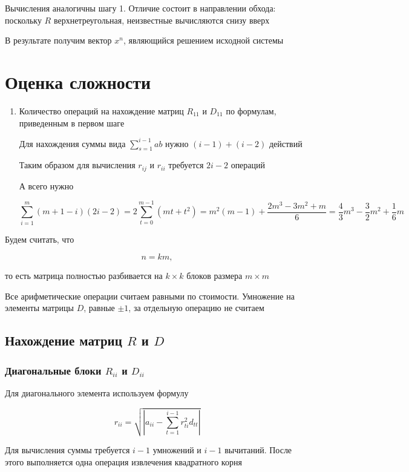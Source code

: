 \documentclass[a4paper,12pt]{article}
\begin{document}
Вычисления аналогичны шагу 1. Отличие состоит в направлении обхода:
поскольку $R$ верхнетреугольная, неизвестные вычисляются снизу вверх

В результате получим вектор $x^n$, являющийся решением исходной
системы

\section{Оценка сложности}

\begin{enumerate}
  \item Количество операций на нахождение матриц $R_{11}$ и $D_{11}$ по формулам, приведенным в первом шаге

  Для нахождения суммы вида $\sum_{s = 1}^{i - 1} a b$ нужно $(i - 1) + (i - 2)$ действий

  Таким образом для вычисления $r_{ij}$ и $r_{ii}$ требуется $2i - 2$ операций

  А всего нужно

  $$\sum_{i = 1}^{m} (m + 1 - i) (2i - 2) = 2\sum_{t = 0}^{m - 1} (mt + t^2) = m^2 (m - 1) + \frac{2m^3 - 3m^2 + m}{6} = \frac{4}{3} m^3 - \frac{3}{2} m^2 + \frac{1}{6} m$$
\end{enumerate}

Будем считать, что

$$
n=km,
$$

то есть матрица полностью разбивается на \(k\times k\) блоков размера \(m\times m\)

Все арифметические операции считаем равными по стоимости. Умножение на элементы матрицы \(D\), равные \(\pm1\), за отдельную операцию не считаем

\subsection{Нахождение матриц \(R\) и \(D\)}

\subsubsection{Диагональные блоки \(R_{ii}\) и \(D_{ii}\)}

Для диагонального элемента используем формулу

$$
r_{ii}
=
\sqrt{
  \left|
  a_{ii}
  -
  \sum_{t=1}^{i-1}r_{ti}^{2}d_{tt}
  \right|
}
$$

Для вычисления суммы требуется \(i-1\) умножений и \(i-1\) вычитаний. После этого выполняется одна операция извлечения квадратного корня
\end{document}
